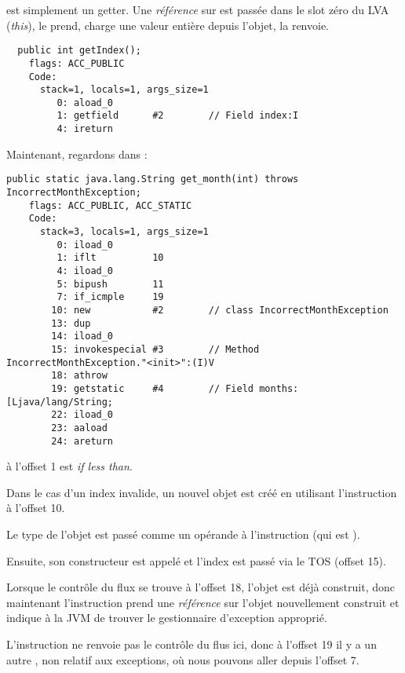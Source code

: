  est simplement un getter.
Une \emph{référence} sur  est passée dans le slot zéro
du \ac{LVA} (\emph{this}),  le prend,  charge une valeur
entière depuis l'objet,  la renvoie.

\begin{lstlisting}
  public int getIndex();
    flags: ACC_PUBLIC
    Code:
      stack=1, locals=1, args_size=1
         0: aload_0
         1: getfield      #2        // Field index:I
         4: ireturn
\end{lstlisting}

Maintenant, regardons  dans :

\begin{lstlisting}[caption=Month2.class]
  public static java.lang.String get_month(int) throws IncorrectMonthException;
    flags: ACC_PUBLIC, ACC_STATIC
    Code:
      stack=3, locals=1, args_size=1
         0: iload_0
         1: iflt          10
         4: iload_0
         5: bipush        11
         7: if_icmple     19
        10: new           #2        // class IncorrectMonthException
        13: dup
        14: iload_0
        15: invokespecial #3        // Method IncorrectMonthException."<init>":(I)V
        18: athrow
        19: getstatic     #4        // Field months:[Ljava/lang/String;
        22: iload_0
        23: aaload
        24: areturn
\end{lstlisting}

 à l'offset 1 est \emph{if less than}.

Dans le cas d'un index invalide, un nouvel objet est créé en utilisant l'instruction
 à l'offset 10.

Le type de l'objet est passé comme un opérande à l'instruction (qui est ).

Ensuite, son constructeur est appelé et l'index est passé via le \ac{TOS} (offset 15).

Lorsque le contrôle du flux se trouve à l'offset 18, l'objet est déjà construit,
donc maintenant l'instruction  prend une \emph{référence} sur l'objet
nouvellement construit et indique à la \ac{JVM} de trouver le gestionnaire d'exception
approprié.

L'instruction  ne renvoie pas le contrôle du flus ici, donc à l'offset
19 il y a un autre , non relatif aux exceptions,
où nous pouvons aller depuis l'offset 7.

